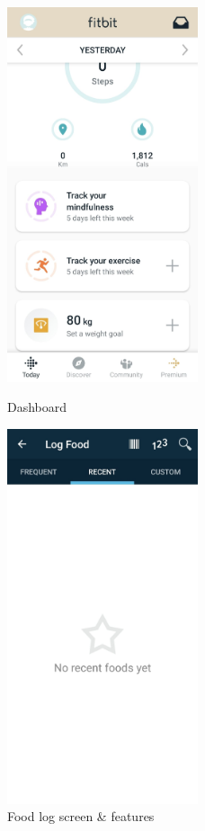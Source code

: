 \begin{figure}[H]
    \begin{minipage}{0.5\textwidth}
        \centering
        \includegraphics[width=0.5\textwidth]{fitbit/dashboard.jpeg}
        \caption{Dashboard}
        \label{fig:fitbit-home}
    \end{minipage}%
    \begin{minipage}{0.5\textwidth}
        \centering
        \includegraphics[width=0.5\textwidth]{fitbit/food-tracker.jpeg}
        \caption{Food log screen \& features}
        \label{fig:fitbit-log}
    \end{minipage}
\end{figure}